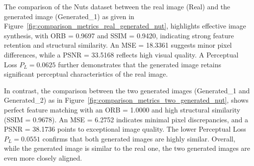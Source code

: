 \documentclass[12pt,DIV14,BCOR12mm,a4paper,footinclude=false,headinclude,parskip=half-,twoside,openright,cleardoublepage=empty,toc=index,bibliography=totoc,listof=totoc]{scrreprt}
\numberwithin{equation}{chapter}
\begin{document}
The comparison of the Nuts dataset between the real image (Real) and the generated image (Generated\_1) as given in Figure~\ref{fig:comparison_metrics_real_generated_nut}, highlights effective image synthesis, with ORB = 0.9697 and SSIM = 0.9420, indicating strong feature retention and structural similarity. An MSE = 18.3361 suggests minor pixel differences, while a PSNR = 33.5168 reflects high visual quality. A Perceptual Loss \( P_L = 0.0625 \) further demonstrates that the generated image retains significant perceptual characteristics of the real image.

In contrast, the comparison between the two generated images (Generated\_1 and Generated\_2) as in Figure~\ref{fig:comparison_metrics_two_generated_nut}, shows perfect feature matching with an ORB = 1.0000 and high structural similarity (SSIM = 0.9678). An MSE = 6.2752 indicates minimal pixel discrepancies, and a PSNR = 38.1736 points to exceptional image quality. The lower Perceptual Loss \( P_L = 0.0551 \) confirms that both generated images are highly similar. Overall, while the generated image is similar to the real one, the two generated images are even more closely aligned.
\end{document}
